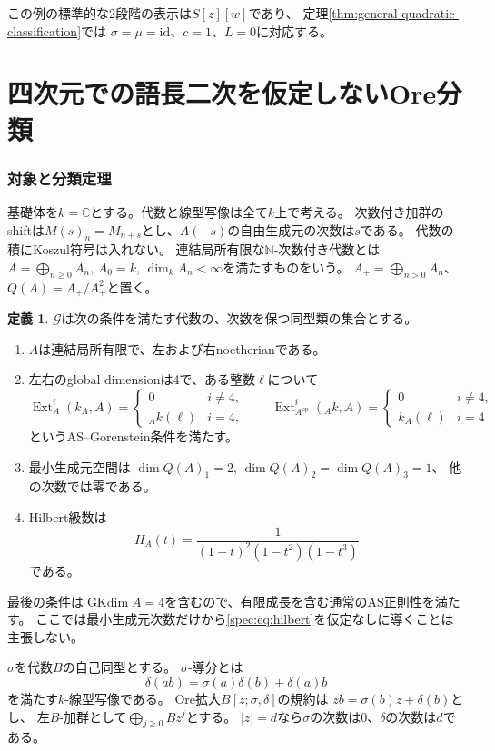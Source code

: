 \documentclass[11pt,a4paper]{ltjsarticle}
\theoremstyle{definition}
\newtheorem{definition}[theorem]{定義}
\newcommand{\Ext}{\operatorname{Ext}}
\newcommand{\GKdim}{\operatorname{GKdim}}
\newcommand{\Gclass}{\mathcal G}
\begin{document}
この例の標準的な2段階の表示は$S[z][w]$であり、
定理\ref{thm:general-quadratic-classification}では
$\sigma=\mu=\mathrm{id}$、$c=1$、$L=0$に対応する。

\clearpage
\part{四次元での語長二次を仮定しないOre分類}
\section{対象と分類定理}\label{spec:sec:theorem}
基礎体を$k=\mathbb C$とする。代数と線型写像は全て$k$上で考える。
次数付き加群のshiftは$M(s)_n=M_{n+s}$とし、$A(-s)$の自由生成元の次数は$s$である。
代数の積にKoszul符号は入れない。
連結局所有限な$\mathbb N$-次数付き代数とは
$A=\bigoplus_{n\geq0}A_n$, $A_0=k$, $\dim_k A_n<\infty$を満たすものをいう。
$A_+=\bigoplus_{n>0}A_n$、$Q(A)=A_+/A_+^2$と置く。

\begin{definition}\label{spec:def:graded-target}
$\Gclass$は次の条件を満たす代数の、次数を保つ同型類の集合とする。
\begin{enumerate}
\item $A$は連結局所有限で、左および右noetherianである。
\item 左右のglobal dimensionは4で、ある整数$\ell$について
\[
\Ext_A^i(k_A,A)=
\begin{cases}0&i\ne4,\\ {}_Ak(\ell)&i=4,\end{cases}
\qquad
\Ext_{A^{\mathrm{op}}}^i({}_Ak,A)=
\begin{cases}0&i\ne4,\\ k_A(\ell)&i=4\end{cases}
\]
というAS--Gorenstein条件を満たす。
\item 最小生成元空間は
$\dim Q(A)_1=2$, $\dim Q(A)_2=\dim Q(A)_3=1$、
他の次数では零である。
\item Hilbert級数は
\begin{equation}\label{spec:eq:hilbert}
H_A(t)=\frac{1}{(1-t)^2(1-t^2)(1-t^3)}
\end{equation}
である。
\end{enumerate}
最後の条件は$\GKdim A=4$を含むので、有限成長を含む通常のAS正則性を満たす。
ここでは最小生成元次数だけから\eqref{spec:eq:hilbert}を仮定なしに導くことは主張しない。
\end{definition}

$\sigma$を代数$B$の自己同型とする。
$\sigma$-導分とは
\[
\delta(ab)=\sigma(a)\delta(b)+\delta(a)b
\]
を満たす$k$-線型写像である。
Ore拡大$B[z;\sigma,\delta]$の規約は
$zb=\sigma(b)z+\delta(b)$とし、
左$B$-加群として$\bigoplus_{j\geq0}Bz^j$とする。
$|z|=d$なら$\sigma$の次数は0、$\delta$の次数は$d$である。
\end{document}
